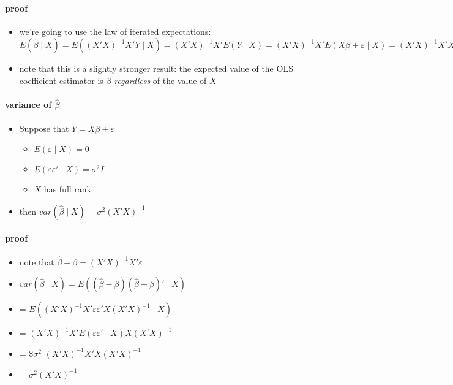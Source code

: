 \paragraph{proof}
\label{sec-3-1-1-1}

\begin{itemize}
\item we're going to use the law of iterated expectations:
         $E(\hat \beta \mid X) = E((X'X)^{-1} X'Y \mid X) = (X'X)^{-1}
           X'E(Y \mid X) = (X'X)^{-1} X'E(X\beta + \varepsilon \mid X) =
         (X'X)^{-1} X'X \beta = \beta$
\item note that this is a slightly stronger result: the expected value
         of the OLS coefficient estimator is $\beta$ \emph{regardless} of the
         value of $X$
\end{itemize}
\paragraph{variance of $\hat \beta$}
\label{sec-3-1-2}

\begin{itemize}
\item Suppose that $Y = X\beta + \varepsilon$
\begin{itemize}
\item $E(\varepsilon \mid X) = 0$
\item $E(\varepsilon \varepsilon' \mid X) = \sigma^2 I$
\item $X$ has full rank
\end{itemize}
\item then $var(\hat \beta \mid X) = \sigma^2 (X'X)^{-1}$
\end{itemize}
\paragraph{proof}
\label{sec-3-1-2-1}

\begin{itemize}
\item note that $\hat\beta - \beta = (X'X)^{-1}X'\varepsilon$
\item $var(\hat \beta \mid X) = E((\hat\beta -
         \beta)(\hat\beta-\beta)' \mid X)$
\item = $E((X'X)^{-1}X'\varepsilon\varepsilon'X(X'X)^{-1} \mid X)$
\item = $(X'X)^{-1} X' E(\varepsilon\varepsilon' \mid X) X (X'X)^{-1}$
\item = \$$\sigma$$^2$ $(X'X)^{-1} X'X (X'X)^{-1}$
\item = $\sigma^2 (X'X)^{-1}$
\end{itemize}
